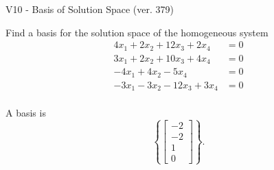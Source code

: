 \begin{exercise}
  \begin{exerciseTitle}V10 - Basis of Solution Space (ver. 379)\end{exerciseTitle}
  \begin{exerciseStatement}
    Find a basis for the solution space of the homogeneous system 
\begin{align*}
 4 x_ 1 + 2 x_ 2 + 12 x_ 3 + 2 x_ 4 &= 0  \\ 
  3 x_ 1 + 2 x_ 2 + 10 x_ 3 + 4 x_ 4 &= 0  \\ 
  -4 x_ 1 + 4 x_ 2 -5 x_ 4 &= 0  \\ 
  -3 x_ 1 -3 x_ 2 -12 x_ 3 + 3 x_ 4 &= 0  \\ 
 \end{align*}


 
  \end{exerciseStatement}

  \begin{exerciseAnswer}
   A basis is   
\[\left\{\left[\begin{array}{c}
-2 \\
-2 \\
1 \\
0
\end{array}\right]\right\}.\]

  


  \end{exerciseAnswer}
\end{exercise}